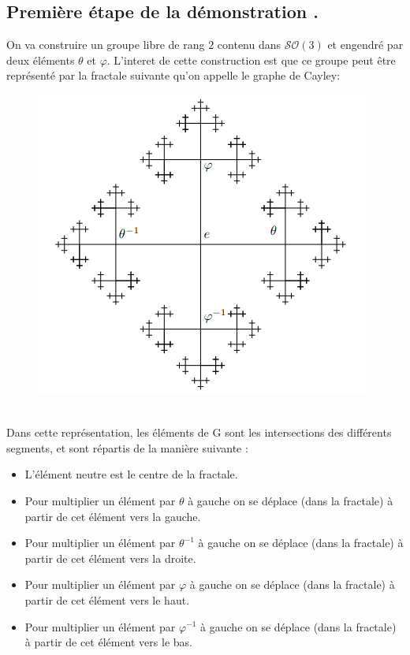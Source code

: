 \subsection{Première étape de la démonstration .}
\noindent
 On va construire un groupe libre de rang $2$ contenu dans $\mathcal{SO}(3)$ et engendré par deux éléments $\theta$ et $\varphi$. L'interet de cette construction est que ce groupe peut être représenté par la fractale suivante qu'on appelle le graphe de Cayley:
  \begin{figure}[h]
      \centering
      \includegraphics[scale=0.5]{./images/bt.png}
      \label{fig1}
  \end{figure}\\
  \noindent
  Dans cette représentation, les éléments de $\mathrm{G}$ sont les intersections des différents segments, et sont répartis de la manière suivante :
  \begin{itemize}
    \item L'élément neutre est le centre de la fractale.
    \item Pour multiplier un élément par $\theta$ à gauche on se déplace (dans la fractale) à partir de cet élément vers la gauche.
    \item Pour multiplier un élément par $\theta^{-1}$ à gauche on se déplace (dans la fractale) à partir de cet élément vers la droite.
    \item Pour multiplier un élément par $\varphi$ à gauche on se déplace (dans la fractale) à partir de cet élément vers le haut.
    \item Pour multiplier un élément par $\varphi^{-1}$ à gauche on se déplace (dans la fractale) à partir de cet élément vers le bas.
  \end{itemize}
